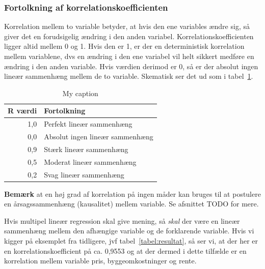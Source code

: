 \subsubsection{Fortolkning af korrelationskoefficienten}
Korrelation mellem to variable betyder, at hvis den ene variables ændre sig, så giver det en forudsigelig ændring i den anden variabel. Korrelationskoefficienten ligger altid mellem 0 og 1. Hvis den er 1, er der en deterministisk korrelation mellem variablene, dvs en ændring i den ene variabel vil helt sikkert medføre en ændring i den anden variable. Hvis værdien derimod er 0, så er der absolut ingen lineær sammenhæng mellem de to variable. Skematisk ser det ud som i tabel~\ref{tabel:correlation}.
\begin{table}[]
\centering
\caption{My caption}
\label{tabel:correlation}
\begin{tabular}{|r|l|}
\hline
\multicolumn{1}{|l|}{R værdi} & Fortolkning                     \\ \hline
1,0                           & Perfekt lineær sammenhæng       \\ \hline
0,0                           & Absolut ingen lineær sammenhæng \\ \hline
0,9                           & Stærk lineær sammenhæng         \\ \hline
0,5                           & Moderat lineær sammenhæng       \\ \hline
0,2                           & Svag lineær sammenhæng          \\ \hline
\end{tabular}
\end{table}
\textbf{Bemærk} at en høj grad af korrelation på ingen måder kan bruges til at postulere en årsagssammenhæng (kausalitet) mellem variable. Se afsnittet TODO for mere.

Hvis multipel lineær regression skal give mening, så \textit{skal} der være en lineær sammenhæng mellem den afhængige variable og de forklarende variable. Hvis vi kigger på eksemplet fra tidligere, jvf tabel~\ref{tabel:resultat}, så ser vi, at der her er en korrelationskoefficient på ca. 0,9553 og at der dermed i dette tilfælde er en korrelation mellem variable pris, byggeomkostninger og rente.

